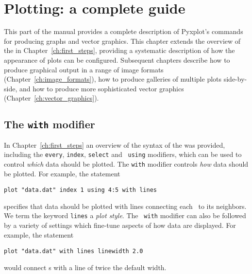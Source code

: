 %
%
%
%
%



\chapter{Plotting: a complete guide}
\label{ch:plotting}

This part of the manual provides a complete description of Pyxplot's commands
for producing graphs and vector graphics. This chapter extends the overview of
the  in Chapter~\ref{ch:first_steps}, providing a systematic
description of how the appearance of plots can be configured.  Subsequent
chapters describe how to produce graphical output in a range of image formats
(Chapter~\ref{ch:image_formats}), how to produce galleries of multiple plots
side-by-side, and how to produce more sophisticated vector graphics
(Chapter~\ref{ch:vector_graphics}).

\section{The {\tt with} modifier}
\label{sec:with_modifier}

In Chapter~\ref{ch:first_steps} an overview of the syntax of the 
was provided, including the {\tt every}, {\tt index}, {\tt select} and {\tt
using} modifiers, which can be used to control {\it which} data should be
plotted. The {\tt with} modifier controls {\it how} data should be plotted. For
example, the statement
\begin{verbatim}
plot "data.dat" index 1 using 4:5 with lines
\end{verbatim}
specifies that data should be plotted with lines connecting each \datapoint\ to
its neighbors. We term the keyword {\tt lines} a {\it plot style}. The {\tt
with} modifier can also be followed by a variety of settings which fine-tune
aspects of how data are displayed.  For example, the statement
\begin{verbatim}
plot "data.dat" with lines linewidth 2.0
\end{verbatim}
would connect \datapoint s with a line of twice the default width.

